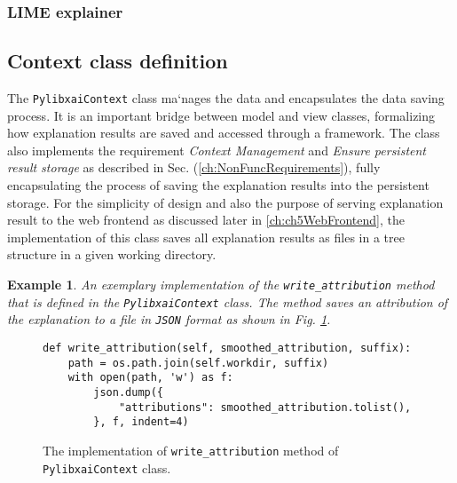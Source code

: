 \documentclass[
    bindingoffset=5mm,  %
    footnoteindent=3mm, %
    hyphenation=true    %
]{src/wut-thesis}
\newtheorem{example}{Example}
\begin{document}
\subsubsection{LIME explainer}


\subsection{Context class definition}

The \texttt{PylibxaiContext} class ma`nages the data and encapsulates the data saving process.
It is an important bridge between model and view classes, formalizing how explanation results
are saved and accessed through a framework.
The class also implements the requirement \textit{Context Management}
and \textit{Ensure persistent result storage} as described
in Sec. (\ref{ch:NonFuncRequirements}), fully encapsulating the process of
saving the explanation results into the persistent storage. For the simplicity of design and also the purpose of serving
explanation result to the web frontend as discussed later in \ref{ch:ch5WebFrontend},
the implementation of this class saves all explanation results as files in a tree structure in a given working directory.

\begin{example}
    An exemplary implementation of the \texttt{write\_attribution} method that is defined in the
    \texttt{PylibxaiContext} class. The method saves an attribution of the explanation to a file in \texttt{JSON} format
    as shown in Fig. \ref{fig:WriteAttributionMethod}.
\end{example}

\begin{figure}%
\begin{verbatim}
def write_attribution(self, smoothed_attribution, suffix):
    path = os.path.join(self.workdir, suffix)
    with open(path, 'w') as f:
        json.dump({
            "attributions": smoothed_attribution.tolist(),
        }, f, indent=4)
\end{verbatim}
\caption{The implementation of \texttt{write\_attribution} method of \texttt{PylibxaiContext} class.}
\label{fig:WriteAttributionMethod}
\end{figure}
\end{document}
